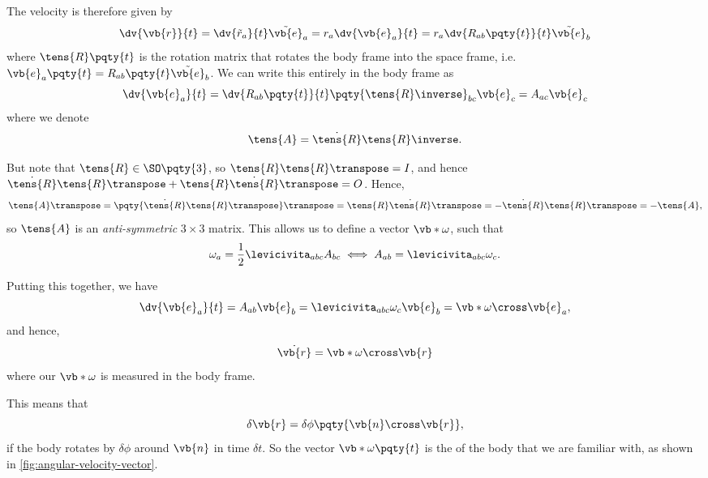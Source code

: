 The velocity is therefore given by
\begin{equation}
    \dv{\vb{r}}{t} = \dv{\tilde{r}_a}{t} \tilde{\vb{e}}_a = r_a \dv{\vb{e}_a}{t} = r_a \dv{R_{ab}\pqty{t}}{t} \tilde{\vb{e}}_b
\end{equation}
where \(\tens{R}\pqty{t}\) is the rotation matrix that rotates the body frame into the space frame, i.e. \(\vb{e}_a\pqty{t} = R_{ab}\pqty{t} \tilde{\vb{e}}_b\). We can write this entirely in the body frame as
\begin{equation}
    \dv{\vb{e}_a}{t} = \dv{R_{ab}\pqty{t}}{t} \pqty{\tens{R}\inverse}_{bc} \vb{e}_c = A_{ac} \vb{e}_c
\end{equation}
where we denote
\begin{equation}
    \tens{A} = \dot{\tens{R}} \tens{R}\inverse.
\end{equation}

But note that \(\tens{R} \in \SO\pqty{3}\), so \(\tens{R} \tens{R} \transpose = I\), and hence \(\dot{\tens{R}} \tens{R}\transpose + \tens{R} \dot{\tens{R}}\transpose = O\). Hence,
\begin{equation}
    \tens{A}\transpose = \pqty{\dot{\tens{R}} \tens{R}\transpose}\transpose = \tens{R} \dot{\tens{R}}\transpose = - \dot{\tens{R}} \tens{R}\transpose = - \tens{A},
\end{equation}
so \(\tens{A}\) is an \emph{anti-symmetric} \(3 \times 3\) matrix. This allows us to define a vector \(\vb*{\omega}\), such that
\begin{equation}
    \omega_a = \frac{1}{2} \levicivita_{abc} A_{bc} \iff A_{ab} = \levicivita_{abc} \omega_c.
\end{equation}

Putting this together, we have
\begin{equation}
    \dv{\vb{e}_a}{t} = A_{ab} \vb{e}_b = \levicivita_{abc} \omega_c \vb{e}_b = \vb*{\omega} \cross \vb{e}_a,
\end{equation}
and hence,
\begin{equation}
    \dot{\vb{r}} = \vb*{\omega} \cross \vb{r}
\end{equation}
where our \(\vb*{\omega}\) is measured in the body frame.

This means that
\begin{equation}
    \delta \vb{r} = \delta \phi \pqty{\vb{n} \cross \vb{r}},
\end{equation}
if the body rotates by \(\delta \phi\) around \(\vb{n}\) in time \(\delta t\). So the vector \(\vb*{\omega} \pqty{t}\) is the  of the body that we are familiar with, as shown in \autoref{fig:angular-velocity-vector}.


